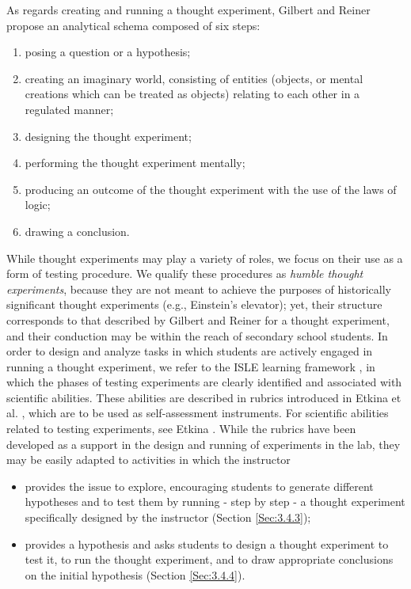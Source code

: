 \documentclass[twocolumn,secnumarabic,amssymb, nobibnotes, aps, prd, nofootinbib]{revtex4-2}
\begin{document}
As regards creating and running a thought experiment, Gilbert and Reiner \cite{Gilbert2000} propose an analytical schema composed of six steps:
\begin{enumerate}
    \item posing a question or a hypothesis;
    \item creating an imaginary world, consisting of entities (objects, or mental creations which can be treated as objects) relating to each other in a regulated manner;
    \item designing the thought experiment;
    \item performing the thought experiment mentally;
    \item producing an outcome of the thought experiment with the use of the laws of logic;
    \item drawing a conclusion.
\end{enumerate}
While thought experiments may play a variety of roles, we focus on their use as a form of testing procedure. We qualify these procedures as \emph{humble thought experiments}, because they are not meant to achieve the purposes of historically significant thought experiments (e.g., Einstein's elevator); yet, their structure corresponds to that described by Gilbert and Reiner \cite{Gilbert2000} for a thought experiment, and their conduction may be within the reach of secondary school students. In order to design and analyze tasks in which students are actively engaged in running a thought experiment, we refer to the ISLE learning framework \cite{Etkina2015}, in which the phases of testing experiments are clearly identified and associated with scientific abilities. These abilities are described in rubrics introduced in Etkina et al. \cite{Etkina2006}, which are to be used as self-assessment instruments. For scientific abilities related to testing experiments, see Etkina \cite[Appendix B]{Etkina2015}. While the rubrics have been developed as a support in the design and running of experiments in the lab, they may be easily adapted to activities in which the instructor
\begin{itemize}
    \item provides the issue to explore, encouraging students to generate different hypotheses and to test them by running - step by step - a thought experiment specifically designed by the instructor (Section \ref{Sec:3.4.3});
    \item provides a hypothesis and asks students to design a thought experiment to test it, to run the thought experiment, and to draw appropriate conclusions on the initial hypothesis (Section \ref{Sec:3.4.4}).
\end{itemize}
\end{document}
